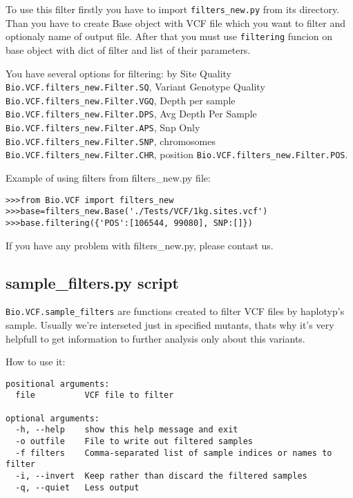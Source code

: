 \noindent To use this filter firstly you have to import \verb|filters_new.py| from its directory. 
\noindent Than you have to create Base object with VCF file which you want to filter and optionaly name of output file. After that you must use \verb|filtering| funcion on base object with dict of filter and list of their parameters.

\noindent You have several options for filtering: by  Site Quality \verb|Bio.VCF.filters_new.Filter.SQ|, Variant Genotype Quality \verb|Bio.VCF.filters_new.Filter.VGQ|, Depth per sample \verb|Bio.VCF.filters_new.Filter.DPS|, Avg Depth Per Sample \verb|Bio.VCF.filters_new.Filter.APS|, Snp Only \verb|Bio.VCF.filters_new.Filter.SNP|, chromosomes \verb|Bio.VCF.filters_new.Filter.CHR|, position \verb|Bio.VCF.filters_new.Filter.POS|.


\noindent Example of using filters from filters\_new.py file:
\begin{verbatim}
>>>from Bio.VCF import filters_new
>>>base=filters_new.Base('./Tests/VCF/1kg.sites.vcf')
>>>base.filtering({'POS':[106544, 99080], SNP:[]})
\end{verbatim}

\noindent If you have any problem with filters\_new.py, please contast us. 

\subsection{sample\_filters.py script}
\noindent \verb|Bio.VCF.sample_filters| are functions created to filter VCF files by haplotyp's sample.
Usually we're interseted just in specified mutants, thats why it's very helpfull to get information to further analysis only about this variants.

\noindent How to use it:

\begin{verbatim}
positional arguments:
  file          VCF file to filter

optional arguments:
  -h, --help    show this help message and exit
  -o outfile    File to write out filtered samples
  -f filters    Comma-separated list of sample indices or names to filter
  -i, --invert  Keep rather than discard the filtered samples
  -q, --quiet   Less output
\end{verbatim}


